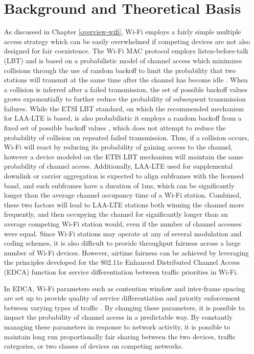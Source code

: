 \section{Background and Theoretical Basis}
\label{background}
As discussed in Chapter \ref{overview-wifi}, \mbox{Wi-Fi} employs a fairly simple multiple access strategy which can be easily overwhelmed if competing devices are not also designed for fair coexistence. The \mbox{Wi-Fi} MAC protocol employs listen-before-talk (LBT) and is based on a probabilistic model of channel access which minimizes collisions through the use of random backoff to limit the probability that two stations will transmit at the same time after the channel has become idle \cite{80211}.  When a collision is inferred after a failed transmission, the set of possible backoff values grows exponentially to further reduce the probability of subsequent transmission failures.  While the ETSI LBT standard, on which the recommended mechanism for \mbox{LAA-LTE} is based, is also probabilistic it employs a random backoff from a fixed set of possible backoff values \cite{3gpp}, which does not attempt to reduce the probability of collision on repeated failed transmission.  Thus, if a collision occurs, \mbox{Wi-Fi} will react by reducing its probability of gaining access to the channel, however a device modeled on the ETIS LBT mechanism will maintain the same probability of channel access.  Additionally, \mbox{LAA-LTE} used for supplemental downlink or carrier aggregation is expected to align subframes with the licensed band, and such subframes have a duration of $1$ms, which can be significantly longer than the average channel occupancy time of a Wi-Fi station.  Combined, these two factors will lead to \mbox{LAA-LTE} stations both winning the channel more frequently, and then occupying the channel for significantly longer than an average competing \mbox{Wi-Fi} station would, even if the number of channel accesses were equal.  Since \mbox{Wi-Fi} stations may operate at any of several modulation and coding schemes, it is also difficult to provide throughput fairness across a large number of Wi-Fi devices. However, airtime fairness can be achieved by leveraging the principles developed for the $802.11$e Enhanced Distributed Channel Access (EDCA) function for service differentiation between traffic priorities in Wi-Fi.  

In EDCA, \mbox{Wi-Fi} parameters such as contention window and inter-frame spacing are set up to provide quality of service differentiation and priority enforcement between varying types of traffic \cite{80211}.  By changing these parameters, it is possible to impact the probability of channel access in a predictable way.  By constantly managing these parameters in response to network activity, it is possible to maintain long run proportionally fair sharing between the two devices, traffic categories, or two classes of devices on competing networks.  


